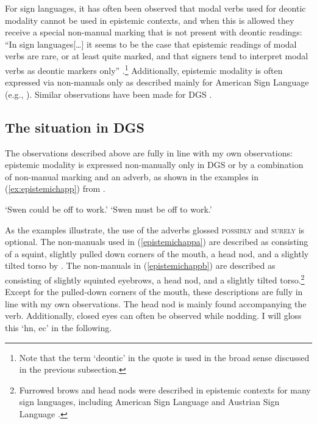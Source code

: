 For sign languages, it has often been observed that modal verbs used for deontic modality cannot be used in epistemic contexts, and when this is allowed they receive a special non-manual marking that is not present with deontic readings: ``In sign languages[\dots ] it seems to be the case that epistemic readings of modal verbs are rare, or at least quite marked, and that signers tend to interpret modal verbs as deontic markers only'' \citep[231]{signgram2017}.\footnote{ Note that the term `deontic' in the quote is used in the broad sense discussed in the previous subsection.} Additionally, epistemic modality is often expressed via non-manuals only as described mainly for American Sign Language (e.g., \citealt{wilcox1995gestural, wilcox1996deontic, shaffer2000syntactic, wilcox2006modality}). Similar observations have been made for DGS \citep{herrmann2013modal, happ2014vork, bross2017scope}.

\subsection{The situation in DGS}
The observations described above are fully in line with my own observations: epistemic modality is expressed non-manually only in DGS or by a combination of non-manual marking and an adverb, as shown in the examples in (\ref{ex:epistemichapp}) from \citet[364]{happ2014vork}.


\begin{exe}
\ex\label{ex:epistemichapp}\begin{xlist}
\ex {}
\glt `Swen could be off to work.'\label{epistemichappa}
\ex {}
\glt `Swen must be off to work.'\label{epistemichappb}
\end{xlist}
\end{exe}

\noindent As the examples illustrate, the use of the adverbs glossed \textsc{possibly} and \textsc{surely} is optional. The non-manuals used in (\ref{epistemichappa}) are described as consisting of a squint, slightly pulled down corners of the mouth, a head nod, and a slightly tilted torso by \citet[364]{happ2014vork}. The non-manuals in (\ref{epistemichappb}) are described as consisting of slightly squinted eyebrows, a head nod, and a slightly tilted torso.\footnote{ Furrowed brows and head nods were described in epistemic contexts for many sign languages, including American Sign Language \citep{wilcox2006modality} and Austrian Sign Language \citep{lackner2017functions}.} Except for the pulled-down corners of the mouth, these descriptions are fully in line with my own observations. The head nod is mainly found accompanying the verb. Additionally, closed eyes can often be observed while nodding. I will gloss this `hn, ec' in the following.

